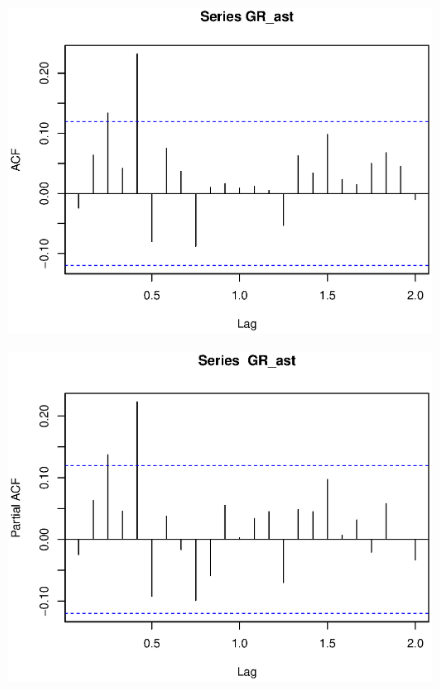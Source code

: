 \documentclass[10.5pt,onecolumn,a4paper]{article}%
\begin{document}
\begin{figure}[h!]
    \begin{multicols}{2}  
        \begin{minipage}[h]{0.5\textwidth} 
            \centering   
            \includegraphics[width=1\textwidth]{pic/acf(gr_ast)}   
               \label{fig:apegrast:a}   
        \end{minipage}
        \begin{minipage}[h]{0.5\textwidth}   
            \centering   
            \includegraphics[width=1\textwidth]{pic/pacf(gr_ast)}   
            \label{fig:pierce:b}   
        \end{minipage}



\end{multicols}
\end{figure}
\end{document}
